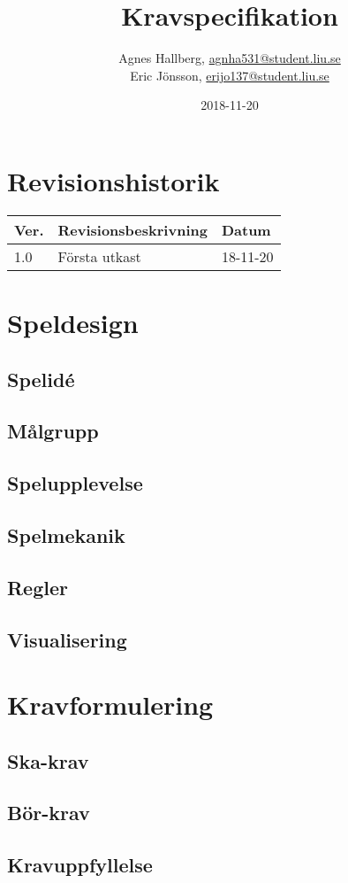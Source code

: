 \documentclass{TDP005mall}
\author{Agnes Hallberg, \url{agnha531@student.liu.se}\\
  Eric Jönsson, \url{erijo137@student.liu.se}}
\title{Kravspecifikation}
\date{2018-11-20}
\begin{document}
\projectpage

\section*{Revisionshistorik}
\begin{table}[!h]
\begin{tabularx}{\linewidth}{|l|X|l|}
\hline
Ver. & Revisionsbeskrivning & Datum \\\hline
1.0 & Första utkast  & 18-11-20 \\\hline
\end{tabularx}
\end{table}

\section{Speldesign}

\subsection{Spelidé}
\subsection{Målgrupp}
\subsection{Spelupplevelse}
\subsection{Spelmekanik}
\subsection{Regler}
\subsection{Visualisering}

\section{Kravformulering}
\subsection{Ska-krav}
\subsection{Bör-krav}
\subsection{Kravuppfyllelse}
\end{document}
